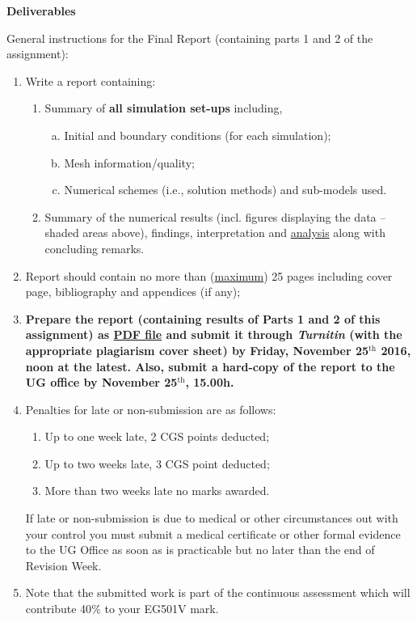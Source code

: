 \documentclass[12pts,a4paper,amsmath,amssymb,floatfix]{article}%
\begin{document}
\clearpage
\begin{center}
\Large{\bf Deliverables}
\end{center}
General instructions for the Final Report (containing parts 1 and 2 of the assignment):
\begin{enumerate}[1)]
  \item Write a report containing:
  \begin{enumerate}
    \item Summary of {\bf all simulation set-ups} including,
       \begin{enumerate} [(a)]
          \item Initial and boundary conditions (for each simulation);
          \item Mesh information/quality;
          \item Numerical schemes (i.e., solution methods) and sub-models used.
       \end{enumerate}
    \item Summary of the numerical results (incl. figures displaying the data -- shaded areas above), findings, interpretation and \underline{analysis} along with concluding remarks.
  \end{enumerate}
  
  \item Report should contain no more than (\underline{maximum}) 25 pages including cover page, bibliography and appendices (if any);

\item {\bf Prepare the report (containing results of Parts 1 and 2 of this assignment) as \underline{PDF file} and submit it through {\it Turnitin} (with the appropriate plagiarism cover sheet) by Friday, November 25$^{\text{th}}$ 2016, noon at the latest. Also, submit a hard-copy of the report to the UG office by November 25$^{\text{th}}$, 15.00h.}
%
%
\item Penalties for late or non-submission are as follows:
\begin{enumerate}%
\item Up to one week late, 2 CGS points deducted;
\item Up to two weeks late, 3 CGS point deducted;
\item More than two weeks late no marks awarded.
\end{enumerate}
If late or non-submission is due to medical or other circumstances out with your control you must submit a medical certificate or other formal evidence to the UG Office as soon as is practicable but no later than the end of Revision Week.


\item Note that the submitted work is part of the continuous assessment which will contribute 40$\%$ to your EG501V mark.

\end{enumerate}
\end{document}
